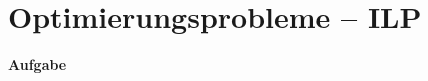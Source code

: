 \documentclass[12pt,a4paper,parskip=full]{scrartcl}
\begin{document}
	\pagestyle{empty} %
	\section*{Optimierungsprobleme – ILP} 
	
	\textbf{\textsf{Aufgabe}} \newline	
	
\end{document}
